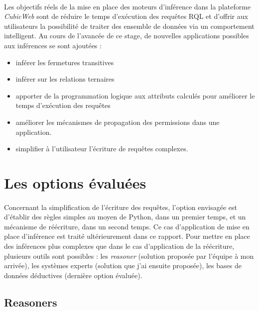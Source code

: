 \documentclass {report}
\begin{document}
\paragraph{}
Les objectifs réels de la mise en place des moteurs d'inférence dans la plateforme \textit{CubicWeb} sont de réduire le temps d'exécution des requêtes RQL et d'offrir aux utilisateurs la possibilité de traiter des ensemble de données via un comportement intelligent. Au cours de l'avancée de ce stage, de nouvelles applications possibles aux inférences se sont ajoutées :
\begin{itemize}
\item inférer les fermetures transitives
\item inférer sur les relations ternaires
\item apporter de la programmation logique aux attributs calculés pour améliorer le temps d'exécution des requêtes
\item améliorer les mécanismes de propagation des permissions dans une application.
\item simplifier à l'utilisateur l'écriture de requêtes complexes.
\end{itemize}

\section{Les options évaluées}
\paragraph{}
Concernant la simplification de l'écriture des requêtes, l'option envisagée est d'établir des règles simples au moyen de Python, dans un premier temps, et un mécanisme de réécriture, dans un second temps. Ce cas d'application de mise en place d'inférence est traité ultérieurement dans ce rapport. Pour mettre en place des inférences plus complexes que dans le cas d'application de la réécriture, plusieurs outils sont possibles : les \textit{reasoner} (solution proposée par l'équipe à mon arrivée), les systèmes experts (solution que j'ai ensuite proposée), les bases de données déductives (dernière option évaluée).


\subsection{Reasoners}
\end{document}
